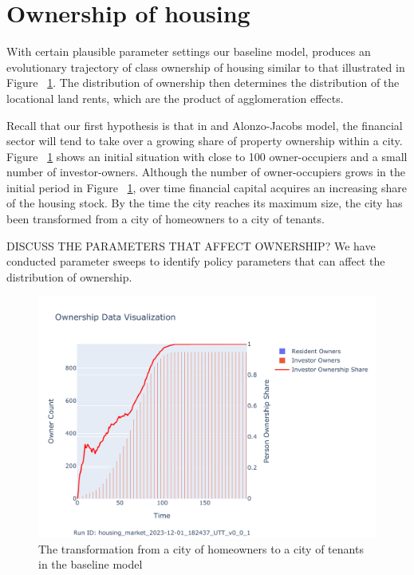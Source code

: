 \section{Ownership of housing}

With certain plausible parameter settings our baseline model, produces an evolutionary trajectory of class ownership of housing similar to that illustrated in Figure ~\ref{fig:Baseline_ownership_trajectory}. The distribution of ownership then determines the distribution of the locational land rents, which are the product of agglomeration effects. 

Recall that our first hypothesis is that in and \Gls{Alonzo-Jacobs model}, the financial sector will tend to take over a growing share of property ownership within a city. Figure ~\ref{fig:Baseline_ownership_trajectory} shows an initial situation with close to 100 owner-occupiers and a small number of investor-owners. Although the number of owner-occupiers grows in the initial period in Figure ~\ref{fig:Baseline_ownership_trajectory}, over time financial capital acquires an increasing share of the housing stock. By the time the city reaches its maximum size, the city has been transformed from a city of homeowners to a city of tenants.

DISCUSS THE PARAMETERS THAT AFFECT OWNERSHIP? We have conducted parameter sweeps to identify policy parameters that can affect the distribution of ownership.

\begin{figure}
    \centering
    \includegraphics[scale=.8, trim={0 1cm 0 1.8cm},clip]{fig/Analysis/Ownership_Data_1.pdf}
    \caption{The transformation from a city of homeowners to a city of tenants in the baseline model}
    \label{fig:Baseline_ownership_trajectory}
\end{figure}

